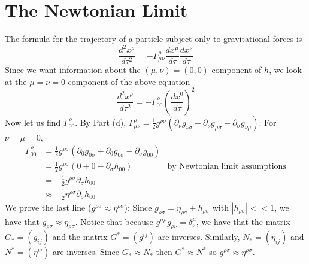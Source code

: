\documentclass[12pt]{article}
\theoremstyle{definition}
\theoremstyle{remark}
\begin{document}
\section{The Newtonian Limit}
	The formula for the trajectory of a particle subject only to gravitational forces is
		\[
			\frac{d^2x^\rho}{d\tau^2} = -\Gamma^\rho_{\mu\nu}\frac{dx^\mu}{d\tau}\frac{dx^\nu}{d\tau}
		\]
	Since we want information about the $(\mu,\nu) = (0,0)$ component of $h$, we look at the $\mu = \nu = 0$ component of the above equation
		\begin{equation}
			\frac{d^2x^\rho}{d\tau^2} = -\Gamma^\rho_{00}\left(\frac{dx^0}{d\tau}\right)^2
			\label{eq:trajectory00}
		\end{equation}
	Now let us find $\Gamma^\rho_{00}$. By Part (d), $\Gamma^\rho_{\mu\nu} = \frac{1}{2}g^{\rho\sigma}(\partial_\nu g_{\nu\sigma} + \partial_\nu g_{\mu\sigma}-\partial_\sigma g_{\nu\mu})$. For $\nu=\mu=0$,
		\begin{align*}
			\Gamma^\rho_{00} &= \frac{1}{2}g^{\rho\sigma}(\partial_0 g_{0\sigma} + \partial_0 g_{0\sigma}-\partial_\sigma g_{00})\\
			&= \frac{1}{2}g^{\rho\sigma}(0 + 0 - \partial_\sigma h_{00}) &\text{by Newtonian limit assumptions}\\
			&= -\frac{1}{2}g^{\rho\sigma}\partial_\sigma h_{00}\\
			&\approx -\frac{1}{2}\eta^{\rho\sigma}\partial_\sigma h_{00}
		\end{align*}
	We prove the last line ($g^{\rho\sigma} \approx \eta^{\rho\sigma}$): Since $g_{\rho\sigma} = \eta_{\rho\sigma} + h_{\rho\sigma}$ with $|h_{\rho\sigma}|<<1$, we have that $g_{\rho\sigma} \approx \eta_{\rho\sigma}$. Notice that because $g^{\mu\rho}g_{\rho\nu} = \delta_\nu^\mu$, we have that the matrix $G_*=(g_{ij})$ and the matrix $G^*=(g^{ij})$ are inverses. Similarly, $N_*=(\eta_{ij})$ and $N^* = (\eta^{ij})$ are inverses. Since $G_*\approx N_*$ then $G^*\approx N^*$ so $g^{\rho\sigma}\approx \eta^{\rho\sigma}$.
\end{document}
